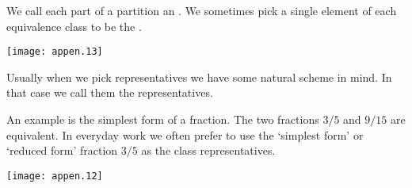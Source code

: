 We call each part of a partition an .%
We sometimes pick a single element of each equivalence class to be the 
.%
\begin{center}
  \texttt{[image: appen.13]}
\end{center}
Usually when we pick representatives we have some natural scheme in mind.
In that case we call them the
 representatives.%
%
%

An example is the simplest form of a fraction.
The two fractions \( 3/5 \) and \( 9/15 \) are equivalent.
In everyday work we often prefer to use the `simplest form' or `reduced form'
fraction $3/5$ as the class representatives.
\begin{center}
  \texttt{[image: appen.12]}
\end{center}
%
